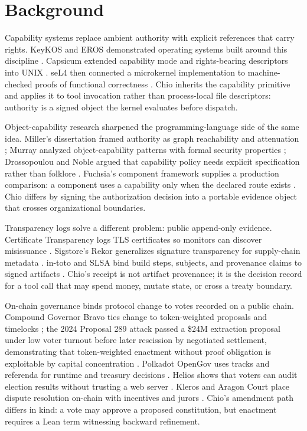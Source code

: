 \section{Background}

Capability systems replace ambient authority with explicit references that carry rights. KeyKOS and EROS demonstrated operating systems built around this discipline \cite{hardy1985keykos,shapiro1999eros}. Capsicum extended capability mode and rights-bearing descriptors into UNIX \cite{watson2010capsicum}. seL4 then connected a microkernel implementation to machine-checked proofs of functional correctness \cite{klein2009sel4,sewell2013sel4}. Chio inherits the capability primitive and applies it to tool invocation rather than process-local file descriptors: authority is a signed object the kernel evaluates before dispatch.

Object-capability research sharpened the programming-language side of the same idea. Miller's dissertation framed authority as graph reachability and attenuation \cite{miller2006composition}; Murray analyzed object-capability patterns with formal security properties \cite{murray2010ocap}; Drossopoulou and Noble argued that capability policy needs explicit specification rather than folklore \cite{drossopoulou2013policy}. Fuchsia's component framework supplies a production comparison: a component uses a capability only when the declared route exists \cite{fuchsiaCapabilities}. Chio differs by signing the authorization decision into a portable evidence object that crosses organizational boundaries.

Transparency logs solve a different problem: public append-only evidence. Certificate Transparency logs TLS certificates so monitors can discover misissuance \cite{rfc9162}. Sigstore's Rekor generalizes signature transparency for supply-chain metadata \cite{sigstoreSecurity,rekorGithub}. in-toto and SLSA bind build steps, subjects, and provenance claims to signed artifacts \cite{torres2019intoto,slsa}. Chio's receipt is not artifact provenance; it is the decision record for a tool call that may spend money, mutate state, or cross a treaty boundary.

On-chain governance binds protocol change to votes recorded on a public chain. Compound Governor Bravo ties change to token-weighted proposals and timelocks \cite{compoundGov}; the 2024 Proposal 289 attack passed a \$24M extraction proposal under low voter turnout before later rescission by negotiated settlement, demonstrating that token-weighted enactment without proof obligation is exploitable by capital concentration \cite{compoundProposal289}. Polkadot OpenGov uses tracks and referenda for runtime and treasury decisions \cite{polkadotOpenGov}. Helios shows that voters can audit election results without trusting a web server \cite{adida2008helios}. Kleros and Aragon Court place dispute resolution on-chain with incentives and jurors \cite{kleros2019,aragonCourt}. Chio's amendment path differs in kind: a vote may approve a proposed constitution, but enactment requires a Lean term witnessing backward refinement.

